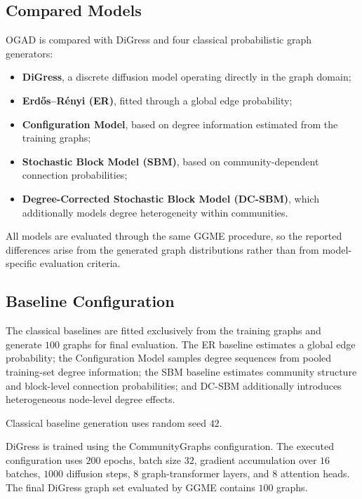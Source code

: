 \subsection{Compared Models}
\label{subsec:exp_models}

OGAD is compared with DiGress and four classical probabilistic graph generators:

\begin{itemize}
    \item \textbf{DiGress}, a discrete diffusion model operating directly in the graph domain;
    \item \textbf{Erd\H{o}s--R\'enyi (ER)}, fitted through a global edge probability;
    \item \textbf{Configuration Model}, based on degree information estimated from the training graphs;
    \item \textbf{Stochastic Block Model (SBM)}, based on community-dependent connection probabilities;
    \item \textbf{Degree-Corrected Stochastic Block Model (DC-SBM)}, which additionally models degree heterogeneity within communities.
\end{itemize}

All models are evaluated through the same GGME procedure, so the reported differences arise from the generated graph distributions rather than from model-specific evaluation criteria.


\subsection{Baseline Configuration}
\label{subsec:exp_baseline_configuration}

The classical baselines are fitted exclusively from the training graphs and generate \(100\) graphs for final evaluation. The ER baseline estimates a global edge probability; the Configuration Model samples degree sequences from pooled training-set degree information; the SBM baseline estimates community structure and block-level connection probabilities; and DC-SBM additionally introduces heterogeneous node-level degree effects.

Classical baseline generation uses random seed \(42\).

DiGress is trained using the CommunityGraphs configuration. The executed configuration uses \(200\) epochs, batch size \(32\), gradient accumulation over \(16\) batches, \(1000\) diffusion steps, \(8\) graph-transformer layers, and \(8\) attention heads. The final DiGress graph set evaluated by GGME contains \(100\) graphs.

